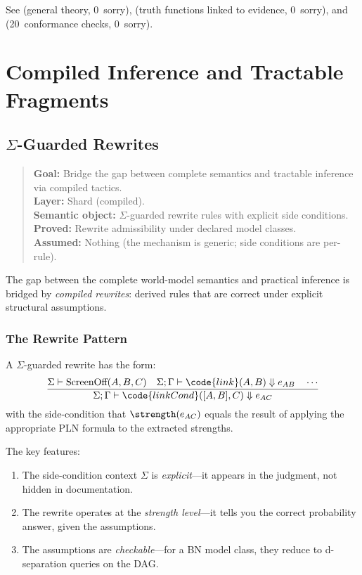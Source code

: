 \documentclass[11pt,openany]{report}
\begin{document}
\noindent
See  (general
theory, 0~sorry),
 (truth
functions linked to evidence, 0~sorry), and
 (20~conformance
checks, 0~sorry).


\part{Compiled Inference and Tractable Fragments}
\label{part:compiled}

\chapter{\texorpdfstring{$\Sigma$}{Sigma}-Guarded Rewrites}
\label{ch:sigma-rewrites}

\begin{quote}\small
\textbf{Goal:} Bridge the gap between complete semantics and tractable inference via compiled tactics.\\
\textbf{Layer:} Shard (compiled).\\
\textbf{Semantic object:} $\Sigma$-guarded rewrite rules with explicit side conditions.\\
\textbf{Proved:} Rewrite admissibility under declared model classes.\\
\textbf{Assumed:} Nothing (the mechanism is generic; side conditions are per-rule).
\end{quote}

The gap between the complete world-model semantics and practical inference
is bridged by \emph{compiled rewrites}: derived rules that are correct
under explicit structural assumptions.

\section{The Rewrite Pattern}

A $\Sigma$-guarded rewrite has the form:
\[
\frac{\Sigma \vdash \text{ScreenOff}(A, B, C) \quad
      \Sigma; \Gamma \vdash \code{link}(A, B) \Downarrow e_{AB} \quad
      \cdots}
     {\Sigma; \Gamma \vdash \code{linkCond}([A, B], C) \Downarrow e_{AC}}
\]
with the side-condition that $\strength(e_{AC})$ equals the result of
applying the appropriate PLN formula to the extracted strengths.

The key features:
\begin{enumerate}
\item The side-condition context $\Sigma$ is \emph{explicit}---it appears
  in the judgment, not hidden in documentation.
\item The rewrite operates at the \emph{strength level}---it tells you
  the correct probability answer, given the assumptions.
\item The assumptions are \emph{checkable}---for a BN model class, they
  reduce to d-separation queries on the DAG.
\end{enumerate}
\end{document}
